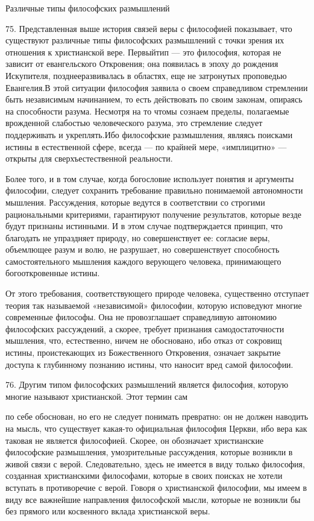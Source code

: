\documentclass[a5paper,10pt]{article}
\begin{document}
Различные типы философских размышлений

75. Представленная выше история связей веры с философией показывает, что
существуют различные типы философских размышлений с точки зрения их отношения к
христианской вере. Первыйтип — это философия, которая не зависит от
евангельского Откровения; она появилась в эпоху до рождения Искупителя,
позднееразвивалась в областях, еще не затронутых проповедью Евангелия.В этой
ситуации философия заявила о своем справедливом стремлении быть независимым
начинанием, то есть действовать по своим законам, опираясь на способности
разума. Несмотря на то чтомы сознаем пределы, полагаемые врожденной слабостью
человеческого разума, это стремление следует поддерживать и укреплять.Ибо
философские размышления, являясь поисками истины в естественной сфере, всегда —
по крайней мере, «имплицитно» — открыты для сверхъестественной реальности.

Более того, и в том случае, когда богословие использует понятия и аргументы
философии, следует сохранить требование правильно понимаемой автономности
мышления. Рассуждения, которые ведутся в соответствии со строгими рациональными
критериями, гарантируют получение результатов, которые везде будут признаны
истинными. И в этом случае подтверждается принцип, что благодать не упраздняет
природу, но совершенствует ее: согласие веры, объемлющее разум и волю, не
разрушает, но совершенствует способность самостоятельного мышления каждого
верующего человека, принимающего богооткровенные истины.

От этого требования, соответствующего природе человека, существенно отступает
теория так называемой «независимой» философии, которую исповедуют многие
современные философы. Она не провозглашает справедливую автономию философских
рассуждений, а скорее, требует признания самодостаточности мышления, что,
естественно, ничем не обосновано, ибо отказ от сокровищ истины, проистекающих
из Божественного Откровения, означает закрытие доступа к глубинному познанию
истины, что наносит вред самой философии.

76. Другим типом философских размышлений является философия, которую многие
называют христианской. Этот термин сам

по себе обоснован, но его не следует понимать превратно: он не должен наводить
на мысль, что существует какая-то официальная философия Церкви, ибо вера как
таковая не является философией. Скорее, он обозначает христианские философские
размышления, умозрительные рассуждения, которые возникли в живой связи с верой.
Следовательно, здесь не имеется в виду только философия, созданная
христианскими философами, которые в своих поисках не хотели вступать в
противоречие с верой. Говоря о христианской философии, мы имеем в виду все
важнейшие направления философской мысли, которые не возникли бы без прямого или
косвенного вклада христианской веры.
\end{document}
